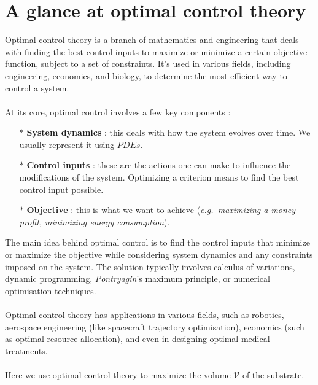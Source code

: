 \documentclass{tudelft-report}
\begin{document}
\chapter{A glance at optimal control theory}
\label{chapter:ocp}
\indent Optimal control theory is a branch of mathematics and engineering that deals with finding the best control inputs to maximize or minimize a certain objective function, subject to a set of constraints. It's used in various fields, including engineering, economics, and biology, to determine the most efficient way to control a system.\\
\\
At its core, optimal control involves a few key components :
\begin{itemize}
 \item[$*$] \textbf{System dynamics }: this deals with how the system evolves over time. We usually represent it using $PDEs$.
 \item[$*$] \textbf{Control inputs }: these are the actions one can make to influence the modifications of the system. Optimizing a criterion means to find the best control input possible.
 \item[$*$] \textbf{Objective }: this is what we want to achieve (\emph{e.g.\ maximizing a money profit, minimizing energy consumption}).
\end{itemize}\noindent
The main idea behind optimal control is to find the control inputs that minimize or maximize the objective while considering system dynamics and any constraints imposed on the system. The solution typically involves calculus of variations, dynamic programming, \textit{Pontryagin}'s maximum principle, or numerical optimisation techniques.\\ \\
Optimal control theory has applications in various fields, such as robotics, aerospace engineering (like spacecraft trajectory optimisation), economics (such as optimal resource allocation), and even in designing optimal medical treatments.\\ \\
Here we use optimal control theory to maximize the volume $\mathcal{V}$ of the substrate.
\end{document}
